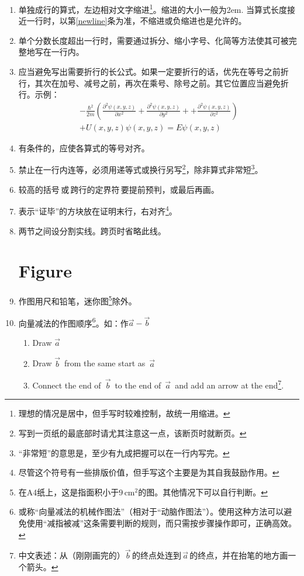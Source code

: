 \documentclass[11pt, a4paper, titlepage]{article}
\begin{document}
\begin{enumerate}
\item 单独成行的算式，左边相对文字缩进\footnote{理想的情况是居中，但手写时较难控制，故统一用缩进。}。缩进的大小一般为2em. 当算式长度接近一行时，以第\ref{newline}条为准，不缩进或负缩进也是允许的。

\item 单个分数长度超出一行时，需要通过拆分、缩小字号、化简等方法使其可被完整地写在一行内。

\item \label{newline}应当避免写出需要折行的长公式。如果一定要折行的话，优先在等号之前折行，其次在加号、减号之前，再次在乘号、除号之前。其它位置应当避免折行。示例：
    \begin{multline*}
        -\frac{{\hbar}^{2}}{2m} \left( \frac{{\partial}^{2}\psi(x,y,z)}{\partial x^{2}} + \frac{{\partial}^{2}\psi(x,y,z)}{\partial y^{2}}+ + \frac{{\partial}^{2}\psi(x,y,z)}{\partial z^{2}} \right) \\
        + U(x,y,z)\psi(x,y,z) = E\psi(x,y,z)
    \end{multline*}

\item 有条件的，应使各算式的等号对齐。

\item 禁止在一行内连等，必须用递等式或换行另写\footnote{写到一页纸的最底部时请尤其注意这一点，该断页时就断页。}，除非算式非常短\footnote{“非常短”的意思是，至少有九成把握可以在一行内写完。}。

\item 较高的括号\,或\,跨行的定界符\,要提前预判，或最后再画。

\item 表示“证毕”的方块放在证明末行，右对齐\footnote{尽管这个符号有一些排版价值，但手写这个主要是为其自我鼓励作用。}。

\item 两节之间设分割实线。跨页时省略此线。





\part{Figure}
\item 作图用尺和铅笔，迷你图\footnote{在A4纸上，这是指面积小于$9\,\mathrm{cm}^{2}$的图。其他情况下可以自行判断。}除外。

\item 向量减法的作图顺序\footnote{或称“向量减法的机械作图法”（相对于“动脑作图法”）。使用这种方法可以避免使用“减指被减”这条需要判断的规则，而只需按步骤操作即可，正确高效。}。如：作$\vec{a} - \vec{b}$
    \begin{enumerate}[label=(\roman*)]
        \item Draw $\vec{a}$
        \item Draw $\vec{b}\,$ from the same start as $\,\vec{a}$
        \item Connect the end of $\,\vec{b}\,$ to the end of $\,\vec{a}\,$ and add an arrow at the end\footnote{中文表述：从（刚刚画完的）$\vec{b}\,$的终点处连到$\,\vec{a}\,$的终点，并在抬笔的地方画一个箭头。}.
    \end{enumerate}


\end{enumerate}
\end{document}
